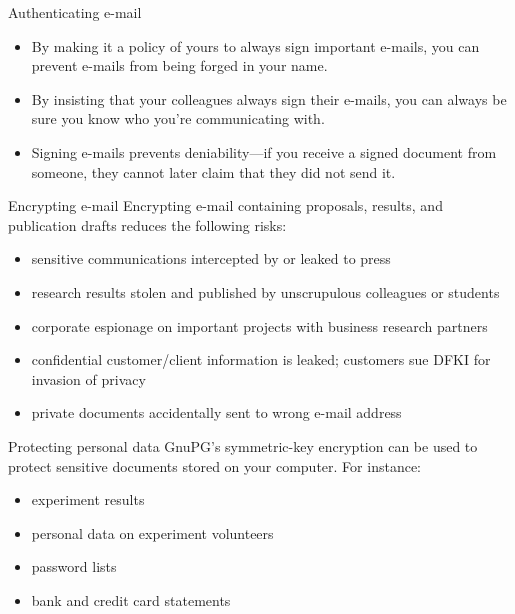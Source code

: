 \documentclass[%
mode=present,%
paper=screen%
]{powerdot}
\begin{document}
\begin{slide}{Authenticating e-mail}
  \begin{itemize}
  \item By making it a policy of yours to always sign important
    e-mails, you can prevent e-mails from being forged in your name.
  \item By insisting that your colleagues always sign their e-mails,
    you can always be sure you know who you're communicating with.
  \item Signing e-mails prevents deniability---if you receive a signed
    document from someone, they cannot later claim that they did not
    send it.
  \end{itemize}
\end{slide}

\begin{slide}{Encrypting e-mail}
  Encrypting e-mail containing proposals, results, and publication
  drafts reduces the following risks:\\[1ex]
  \begin{itemize}
  \item sensitive communications intercepted by or leaked to press
  \item research results stolen and published by unscrupulous
    colleagues or students
  \item corporate espionage on important projects with business
    research partners
  \item confidential customer/client information is leaked; customers
    sue DFKI for invasion of privacy
  \item private documents accidentally sent to wrong e-mail address
  \end{itemize}
\end{slide}

\begin{slide}{Protecting personal data}
  GnuPG's symmetric-key encryption can be used to protect sensitive
  documents stored on your computer.  For instance:\\[1ex]
  \begin{itemize}
  \item experiment results
  \item personal data on experiment volunteers
  \item password lists
  \item bank and credit card statements
  \end{itemize}
\end{slide}
\end{document}
